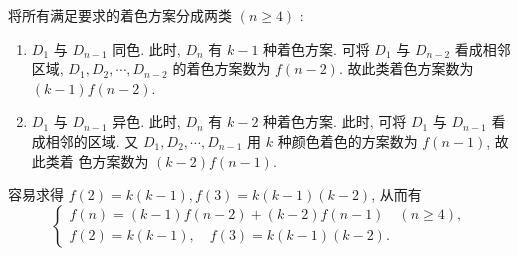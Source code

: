 \documentclass[punct]{ctexbeamer}
\def\sol{\noindent {\bf 解\ }}
\begin{document}
\begin{frame}
	\sol 将所有满足要求的着色方案分成两类 $(n \geqslant 4)$ :

\begin{enumerate}
	\item  $D_1$ 与 $D_{n-1}$ 同色. 此时, $D_n$ 有 $k-1$ 种着色方案. 可将 $D_1$ 与 $D_{n-2}$ 看成相邻 区域, $D_1, D_2, \cdots, D_{n-2}$ 的着色方案数为 $f(n-2)$. 故此类着色方案数为 $(k-1) f(n-2)$.
	\item  $D_1$ 与 $D_{n-1}$ 异色. 此时, $D_n$ 有 $k-2$ 种着色方案. 此时, 可将 $D_1$ 与 $D_{n-1}$ 看 成相邻的区域. 又 $D_1, D_2, \cdots, D_{n-1}$ 用 $k$ 种颜色着色的方案数为 $f(n-1)$, 故此类着 色方案数为 $(k-2) f(n-1)$.
\end{enumerate}
	容易求得 $f(2)=k(k-1), f(3)=k(k-1)(k-2)$, 从而有
	$$
	\left\{\begin{array}{l}
		f(n)=(k-1) f(n-2)+(k-2) f(n-1) \quad(n \geqslant 4), \\
		f(2)=k(k-1), \quad f(3)=k(k-1)(k-2) .
	\end{array}\right.
	$$
\end{frame}
\end{document}
